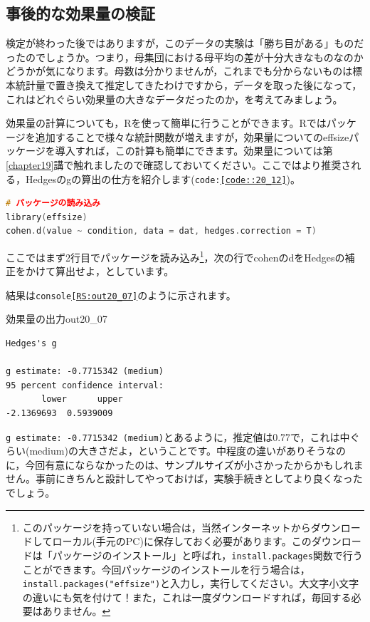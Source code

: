 \documentclass{ltjsbook}
\begin{document}
\subsection{事後的な効果量の検証}
検定が終わった後ではありますが，このデータの実験は「勝ち目がある」ものだったのでしょうか。つまり，母集団における母平均の差が十分大きなものなのかどうかが気になります。母数は分かりませんが，これまでも分からないものは標本統計量で置き換えて推定してきたわけですから，データを取った後になって，これはどれぐらい効果量の大きなデータだったのか，を考えてみましょう。

効果量の計算についても，Rを使って簡単に行うことができます。Rではパッケージを追加することで様々な統計関数が増えますが，効果量についての\textsf{effsize}パッケージ\citep{effsize}を導入すれば，この計算も簡単にできます。効果量については第\ref{chapter19}講で触れましたので確認しておいてください。ここではより推奨される，Hedgesのgの算出の仕方を紹介します(\texttt{code:\ref{code::20_12}})。

\begin{lstlisting}[language=c++,label={code::20_12},caption={効果量を求める}]
# パッケージの読み込み
library(effsize)
cohen.d(value ~ condition, data = dat, hedges.correction = T)
\end{lstlisting}
ここではまず2行目でパッケージを読み込み\footnote{このパッケージを持っていない場合は，当然インターネットからダウンロードしてローカル(手元のPC)に保存しておく必要があります。このダウンロードは「パッケージのインストール」と呼ばれ，\texttt{install.packages}関数で行うことができます。今回パッケージのインストールを行う場合は，\texttt{install.packages("effsize")}と入力し，実行してください。大文字小文字の違いにも気を付けて！また，これは一度ダウンロードすれば，毎回する必要はありません。}，次の行でcohenのdをHedgesの補正をかけて算出せよ，としています。

結果は\texttt{console\ref{RS:out20_07}}のように示されます。
\begin{Rscreen}{効果量の出力}{out20_07}
\begin{verbatim}
Hedges's g

g estimate: -0.7715342 (medium)
95 percent confidence interval:
       lower      upper 
-2.1369693  0.5939009 
\end{verbatim}
\end{Rscreen}

\texttt{g estimate: -0.7715342 (medium)}とあるように，推定値は0.77で，これは中ぐらい(medium)の大きさだよ，ということです。中程度の違いがありそうなのに，今回有意にならなかったのは、サンプルサイズが小さかったからかもしれません。事前にきちんと設計してやっておけば，実験手続きとしてより良くなったでしょう。
\end{document}
